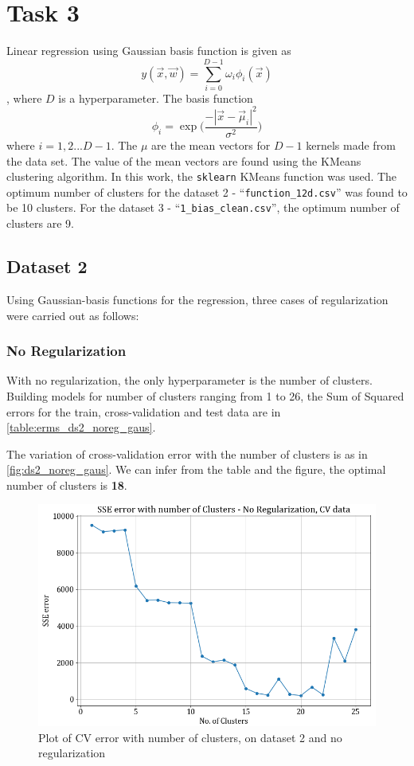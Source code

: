 \documentclass[12pt,a4paper]{article}
\newcommand{\noi}{\noindent}
\def\tt#1{\texttt{#1}}
\begin{document}
\break
\section{Task 3}
Linear regression using Gaussian basis function is given as 
\begin{equation}
    y(\vec{x},\vec{w}) = \sum_{i=0}^{D-1} \omega_{i}\phi_{i}(\vec{x})
\end{equation},
where $D$ is a hyperparameter. The basis function 
\begin{equation}
    \phi_{i} = \exp\Big(\frac{-|\vec{x} - \vec{\mu}_i|^2}{\sigma^2}\Big)
\end{equation}
where $i = 1,2 ... D-1$. The $\mu$ are the mean vectors for $D-1$ kernels made from the data set. The value of the mean vectors are found using the KMeans clustering algorithm. In this work, the \tt{sklearn} KMeans function was used. The optimum number of clusters for the dataset 2 - ``\texttt{function\_12d.csv}'' was found to be 10 clusters. For the dataset 3 - ``\tt{1\_bias\_clean.csv}'', the optimum number of clusters are 9.

\subsection{Dataset 2}
Using Gaussian-basis functions for the regression, three cases of regularization were carried out as follows:

\subsubsection{No Regularization}
With no regularization, the only hyperparameter is the number of clusters. Building models for number of clusters ranging from 1 to 26, the Sum of Squared errors for the train, cross-validation and test data are in \autoref{table:erms_ds2_noreg_gaus}.


\noi
The variation of cross-validation error with the number of clusters is as in \autoref{fig:ds2_noreg_gaus}. We can infer from the table and the figure, the optimal number of clusters is \textbf{18}.
\begin{figure}[H]
    \centering
    \includegraphics[scale=0.5]{images/errorplot_ds2_no_reg.png}
    \caption{Plot of CV error with number of clusters, on dataset 2 and no regularization}
    \label{fig:ds2_noreg_gaus}
\end{figure}
\end{document}
